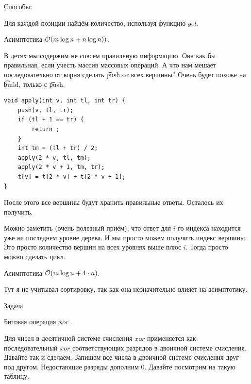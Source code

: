 Способы:

\up \up
\begin{MyList}[0pt]
	\item Для каждой позиции найдём количество, используя функцию $get$.
	
	Асимптотика $\mathcal{O}(m \log n + n \log n))$.
	
	\item  В детях мы содержим не совсем правильную информацию. Она как бы правильная, если учесть массив массовых операций. А что нам мешает последовательно от корня сделать \t{push} от всех вершины? Очень будет похоже на \t{build}, только с \t{push}.
	
\begin{verbatim}
void apply(int v, int tl, int tr) {
	push(v, tl, tr);
	if (tl + 1 == tr) {
		return ;
	}
	int tm = (tl + tr) / 2;
	apply(2 * v, tl, tm);
	apply(2 * v + 1, tm, tr);
	t[v] = t[2 * v] + t[2 * v + 1];
}
\end{verbatim}

	
	После этого все вершины будут хранить правильные ответы. Осталось их получить.
	
	Можно заметить (очень полезный приём), что ответ для $i$-го индекса находится уже на последнем уровне дерева. И мы просто можем получить индекс вершины. Это просто количество вершин на всех уровнях выше плюс $i$. Тогда просто можно сделать цикл.
	
	Асимптотика $\mathcal{O}(m \log n + 4 \cdot n)$.
\end{MyList}

Тут я не учитывал сортировку, так как она незначительно влияет на асимптотику.

\pagebreak


\href{https://codeforces.com/problemset/problem/242/E}{Задача}

Битовая операция $xor$ {}. 

Для чисел в десятичной системе счисления $xor$ применяется как последовательный $xor$ соответствующих разрядов в двоичной системе счисления. Давайте так и сделаем. Запишем все числа в двоичной системе счисления друг под другом. Недостающие разряды дополним $0$. Давайте посмотрим на такую таблицу. 

